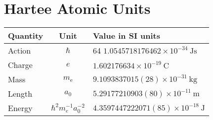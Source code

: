 \documentclass[../main]{subfiles}
\begin{document}
\part{Hartee Atomic Units}

\begin{table}[hbtp]
  \label{table:data_type}
  \centering
  \begin{tabular}{lcl}
    \hline
    Quantity  & Unit & Value in SI units \\
    \hline \hline
    Action & $\hbar$ & 64 $1.0545718176462\times 10^{-34}~\mathrm{Js}$\\
    Charge  & $e$ & $1.602176634\times 10^{-19}~\mathrm{C}$ \\
    Mass  & $m_\mathrm{e}$ & $9.1093837015(28)\times 10^{-31}~\mathrm{kg}$ \\
    Length & $a_0$ & $5.29177210903(80)\times 10^{-11}~\mathrm{m}$ \\
    \hline \hline
    Energy & $\hbar^2m_e^{-1}a_0^{-2}$ & $4.3597447222071(85)\times 10^{-18}~\mathrm{J}$ \\
    \hline
  \end{tabular}
\end{table}
\end{document}
